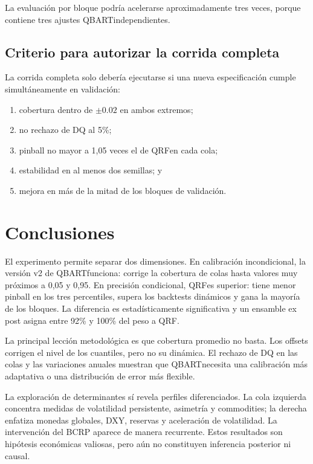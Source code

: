 \documentclass[11pt,a4paper]{article}
\newcommand{\qbart}{\textsc{QBART}}
\newcommand{\qrf}{\textsc{QRF}}
\begin{document}
La evaluación por bloque podría acelerarse aproximadamente tres veces,
porque contiene tres ajustes \qbart independientes.

\subsection{Criterio para autorizar la corrida completa}

La corrida completa solo debería ejecutarse si una nueva especificación
cumple simultáneamente en validación:

\begin{enumerate}[leftmargin=*]
  \item cobertura dentro de \(\pm 0.02\) en ambos extremos;
  \item no rechazo de DQ al 5\%;
  \item pinball no mayor a 1,05 veces el de \qrf en cada cola;
  \item estabilidad en al menos dos semillas; y
  \item mejora en más de la mitad de los bloques de validación.
\end{enumerate}

\section{Conclusiones}

El experimento permite separar dos dimensiones. En calibración
incondicional, la versión v2 de \qbart funciona: corrige la cobertura de
colas hasta valores muy próximos a 0,05 y 0,95. En precisión condicional,
\qrf es superior: tiene menor pinball en los tres percentiles, supera los
backtests dinámicos y gana la mayoría de los bloques. La diferencia es
estadísticamente significativa y un ensamble ex post asigna entre 92\% y
100\% del peso a \qrf.

La principal lección metodológica es que cobertura promedio no basta. Los
offsets corrigen el nivel de los cuantiles, pero no su dinámica. El rechazo
de DQ en las colas y las variaciones anuales muestran que \qbart necesita una
calibración más adaptativa o una distribución de error más flexible.

La exploración de determinantes sí revela perfiles diferenciados. La cola
izquierda concentra medidas de volatilidad persistente, asimetría y
commodities; la derecha enfatiza monedas globales, DXY, reservas y
aceleración de volatilidad. La intervención del BCRP aparece de manera
recurrente. Estos resultados son hipótesis económicas valiosas, pero aún no
constituyen inferencia posterior ni causal.
\end{document}
